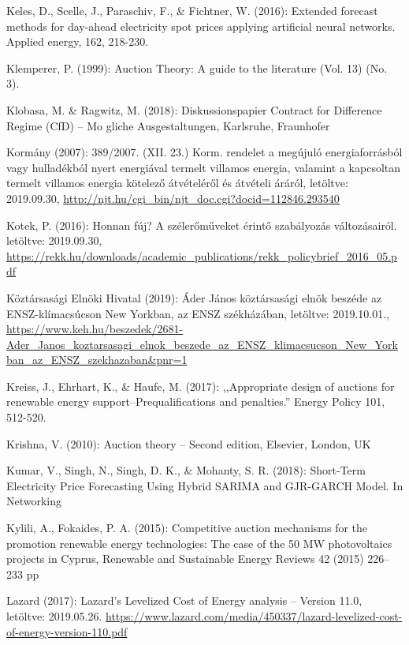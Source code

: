 \documentclass[twoside, magyar, showtrims]{corvinusphd}
\theoremstyle{plain}
\theoremstyle{remark}
\theoremstyle{definition}
\begin{document}
\begin{thebibliography}{99}
Keles, D., Scelle, J., Paraschiv, F., \& Fichtner, W. (2016): Extended forecast methods for day-ahead electricity spot prices applying artificial neural networks. Applied energy, 162, 218-230.

Klemperer, P. (1999): Auction Theory: A guide to the literature (Vol. 13) (No. 3).

Klobasa, M. \& Ragwitz, M. (2018): Diskussionspapier Contract for Difference Regime (CfD) – Mo gliche Ausgestaltungen, Karlsruhe, Fraunhofer

Kormány (2007): 389/2007. (XII. 23.) Korm. rendelet a megújuló energiaforrásból vagy hulladékból nyert energiával termelt villamos energia, valamint a kapcsoltan termelt villamos energia kötelező átvételéről és átvételi áráról, letöltve: 2019.09.30,
\url{http://njt.hu/cgi\_bin/njt\_doc.cgi?docid=112846.293540}

Kotek, P. (2016): Honnan fúj? A szélerőműveket érintő szabályozás változásairól. letöltve: 2019.09.30,
\url{https://rekk.hu/downloads/academic\_publications/rekk\_policybrief\_2016\_05.pdf}

Köztársasági Elnöki Hivatal (2019): Áder János köztársasági elnök beszéde az ENSZ-klímacsúcson New Yorkban, az ENSZ székházában, letöltve: 2019.10.01.,
\url{https://www.keh.hu/beszedek/2681-Ader\_Janos\_koztarsasagi\_elnok\_beszede\_az\_ENSZ\_klimacsucson\_New\_Yorkban\_az\_ENSZ\_szekhazaban\&pnr=1}

Kreiss, J., Ehrhart, K., \& Haufe, M. (2017): ,,Appropriate design of auctions for renewable energy support–Prequalifications and penalties.'' Energy Policy 101, 512-520.

Krishna, V. (2010): Auction theory – Second edition, Elsevier, London, UK

Kumar, V., Singh, N., Singh, D. K., \& Mohanty, S. R. (2018): Short-Term Electricity Price Forecasting Using Hybrid SARIMA and GJR-GARCH Model. In Networking 

Kylili, A., Fokaides, P. A. (2015): Competitive auction mechanisms for the promotion renewable energy technologies: The case of the 50 MW photovoltaics projects in Cyprus, Renewable and Sustainable Energy Reviews 42 (2015) 226–233 pp

Lazard (2017): Lazard’s Levelized Cost of Energy analysis – Version 11.0, letöltve: 2019.05.26.
\url{https://www.lazard.com/media/450337/lazard-levelized-cost-of-energy-version-110.pdf}


\end{thebibliography}
\end{document}
